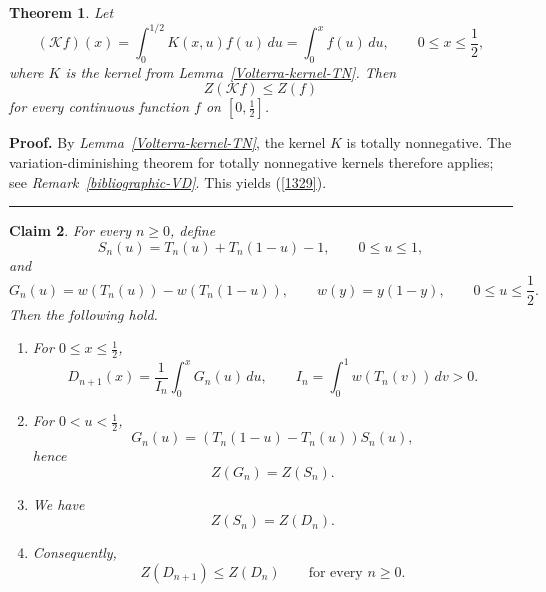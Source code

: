 \documentclass[onecolumn]{article}
\newtheorem{theorem}{Theorem}
\newtheorem{claim}[theorem]{Claim}
\newenvironment{proof}[1][Proof]{\noindent\textbf{#1.} }{\ \rule{0.5em}{0.5em}}
\begin{document}
\begin{theorem}
\label{VD-Volterra} Let 
\begin{equation}
(\mathcal{K}f)(x)=\int_{0}^{1/2}K(x,u)f(u)\,du=\int_{0}^{x}f(u)\,du,\qquad
0\leq x\leq \frac{1}{2},  \label{1328}
\end{equation}%
where $K$ is the kernel from \textit{Lemma~\ref{Volterra-kernel-TN}}. Then 
\begin{equation}
Z(\mathcal{K}f)\leq Z(f)  \label{1329}
\end{equation}%
for every continuous function $f$ on $[0,\tfrac{1}{2}]$.
\end{theorem}

\begin{proof}
By \textit{Lemma~\ref{Volterra-kernel-TN}}, the kernel $K$ is totally
nonnegative. The variation-diminishing theorem for totally nonnegative
kernels therefore applies; see \textit{Remark~\ref{bibliographic-VD}}. This
yields (\ref{1329}). \hfill
\end{proof}

\begin{claim}
\label{VD-applied} For every $n\geq 0$, define 
\begin{equation}
S_{n}(u)=T_{n}(u)+T_{n}(1-u)-1,\qquad 0\leq u\leq 1,  \label{1330}
\end{equation}%
and 
\begin{equation}
G_{n}(u)=w(T_{n}(u))-w(T_{n}(1-u)),\qquad w(y)=y(1-y),\qquad 0\leq u\leq 
\frac{1}{2}.  \label{1331}
\end{equation}%
Then the following hold.

\begin{enumerate}
\item For $0\leq x\leq \tfrac{1}{2}$, 
\begin{equation}
D_{n+1}(x)=\frac{1}{I_{n}}\int_{0}^{x}G_{n}(u)\,du,\qquad
I_{n}=\int_{0}^{1}w(T_{n}(v))\,dv>0.  \label{C1-Dn1-primitive}
\end{equation}

\item For $0<u<\tfrac{1}{2}$, 
\begin{equation}
G_{n}(u)=(T_{n}(1-u)-T_{n}(u))S_{n}(u),  \label{C1-Gn-factor}
\end{equation}%
hence 
\begin{equation}
Z(G_{n})=Z(S_{n}).  \label{C1-ZGn-ZSn}
\end{equation}

\item We have 
\begin{equation}
Z(S_{n})=Z(D_{n}).  \label{C1-ZSn-ZDn}
\end{equation}

\item Consequently, 
\begin{equation}
Z(D_{n+1})\leq Z(D_{n})\qquad \text{for every }n\geq 0.  \label{C1-ZDn-mon}
\end{equation}
\end{enumerate}
\end{claim}
\end{document}

